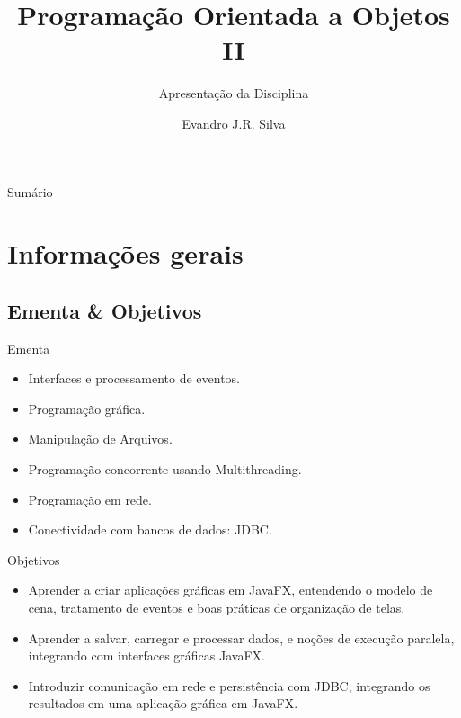\documentclass{beamer}
\title[AP 00]{Programação Orientada a Objetos II}
\subtitle{Apresentação da Disciplina}
\author[E.J.R. Silva]{Evandro J.R. Silva}
\date{}
\begin{document}
\begin{frame}
    \titlepage
\end{frame}

\begin{frame}{Sumário}
    \tableofcontents
\end{frame}

\section{Informações gerais}

\subsection{Ementa \& Objetivos}

\begin{frame}{Ementa}
    \begin{itemize}
        \justifying
        \item Interfaces e processamento de eventos.
        \item Programação gráfica.
        \item Manipulação de Arquivos.
        \item Programação concorrente usando Multithreading.
        \item Programação em rede.
        \item Conectividade com bancos de dados: JDBC.
    \end{itemize}
\end{frame}

\begin{frame}{Objetivos}
    \begin{itemize}
        \justifying
        \item Aprender a criar aplicações gráficas em JavaFX, entendendo o modelo de cena, tratamento de eventos e boas práticas de organização de telas.
        \item Aprender a salvar, carregar e processar dados, e noções de execução paralela, integrando com interfaces gráficas JavaFX.
        \item Introduzir comunicação em rede e persistência com JDBC, integrando os resultados em uma aplicação gráfica em JavaFX.
    \end{itemize}
\end{frame}
\end{document}
